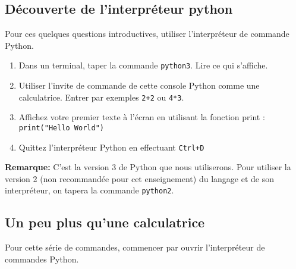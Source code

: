 
\subsection{Découverte de l'interpréteur python}

Pour ces quelques questions introductives, utiliser l'interpréteur de
commande Python.

\begin{enumerate}

\item Dans un terminal, taper la commande \texttt{python3}. Lire ce qui s'affiche.

\item Utiliser l'invite de commande  de cette console Python comme une
  calculatrice. Entrer par exemples \verb-2+2- ou \verb+4*3+.

\item Affichez votre premier texte  à l'écran en utilisant la fonction
  print : \\ \texttt{print("Hello World")}

\item Quittez l'interpréteur Python en effectuant \texttt{Ctrl+D}

\end{enumerate}

\noindent \textbf{Remarque:} C'est la version 3 de Python que nous utiliserons.
Pour utiliser la version 2 (non recommandée pour cet enseignement) du langage et de son interpréteur,
on tapera la commande \texttt{python2}.


\subsection{Un peu plus qu'une calculatrice}

Pour   cette  série   de   commandes, commencer  par   ouvrir
l'interpréteur de commandes Python.

